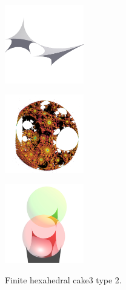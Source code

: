 \documentclass[suppldata, dvipdfmx]{interact}
\theoremstyle{plain}%
\theoremstyle{definition}
\theoremstyle{remark}
\theoremstyle{problemstyle}
\begin{document}
\begin{figure}[h!tbp]
 \begin{minipage}{0.5\textwidth}
  \begin{minipage}[t]{0.24\textwidth}
   \centering \includegraphics[width=1.35in, height=1.35in,
   keepaspectratio]{./img/sphairahedron/hexahedralCake3/sphairahedronFinite_b.jpg}
   \label{fig:cake3finiteSphairahedronType2}
  \end{minipage}
  \hspace*{\fill}
  \begin{minipage}[t]{0.24\textwidth}
   \centering
   \includegraphics[width=1.35in, height=1.35in,
   keepaspectratio]{./img/sphairahedron/hexahedralCake3/limitsetFinite_b.jpg}
   \label{fig:cake3finiteLimitsetType2}
  \end{minipage}
  \hspace*{\fill}
  \caption{Finite hexahedral cake3 type 2.}
  \label{fig:cake3finiteType2}
 \end{minipage}
 \hspace*{\fill}
 \begin{minipage}{0.5\textwidth}
  \begin{minipage}[t]{0.24\textwidth}
   \centering
   \includegraphics[width=1.35in, height=1.35in,
   keepaspectratio]{./img/sphairahedron/hexahedralCake3/sphairahedralPrismInf_b.jpg}
   \label{fig:cake3infiniteSphairahedronType2}

\end{minipage}
\end{minipage}
\end{figure}
\end{document}
